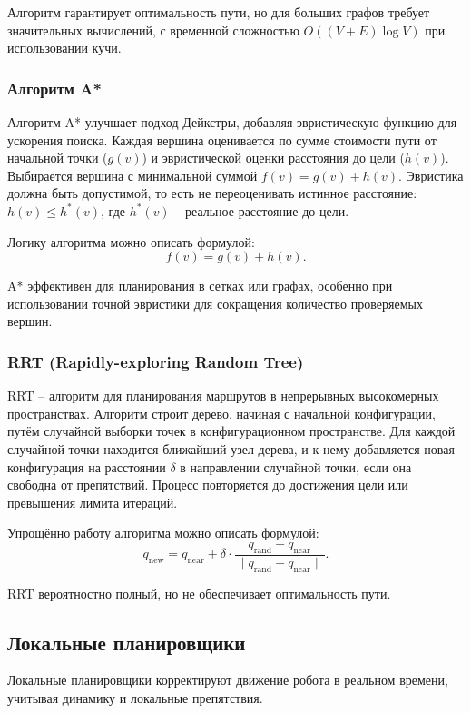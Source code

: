 Алгоритм гарантирует оптимальность пути,
но для больших графов требует значительных вычислений,
с временной сложностью $O((V + E) \log V)$ при использовании кучи.

\subsubsection{Алгоритм A*}
\hfill

Алгоритм A* улучшает подход Дейкстры,
добавляя эвристическую функцию для ускорения поиска.
Каждая вершина оценивается по сумме стоимости пути от начальной точки ($g(v)$)
и эвристической оценки расстояния до цели ($h(v)$).
Выбирается вершина с минимальной суммой $f(v) = g(v) + h(v)$.
Эвристика должна быть допустимой, то есть не переоценивать истинное расстояние: $h(v) \leq h^*(v)$,
где $h^*(v)$ -- реальное расстояние до цели.

Логику алгоритма можно описать формулой:
\begin{equation}
f(v) = g(v) + h(v).
\end{equation}

A* эффективен для планирования в сетках или графах,
особенно при использовании точной эвристики для сокращения количество проверяемых вершин.

\subsubsection{RRT (Rapidly-exploring Random Tree)}
RRT -- алгоритм для планирования маршрутов в непрерывных высокомерных пространствах. 
Алгоритм строит дерево, начиная с начальной конфигурации, 
путём случайной выборки точек в конфигурационном пространстве.
Для каждой случайной точки находится ближайший узел дерева,
и к нему добавляется новая конфигурация на расстоянии $\delta$ в направлении случайной точки,
если она свободна от препятствий. Процесс повторяется до достижения цели или превышения лимита итераций.

Упрощённо работу алгоритма можно описать формулой:
\begin{equation}
q_{\text{new}} = q_{\text{near}} + \delta \cdot \frac{q_{\text{rand}} - q_{\text{near}}}{\| q_{\text{rand}} - q_{\text{near}} \|}.
\end{equation}

RRT вероятностно полный, но не обеспечивает оптимальность пути.

\subsection{Локальные планировщики}
Локальные планировщики корректируют движение робота в реальном времени, учитывая динамику и локальные препятствия.


